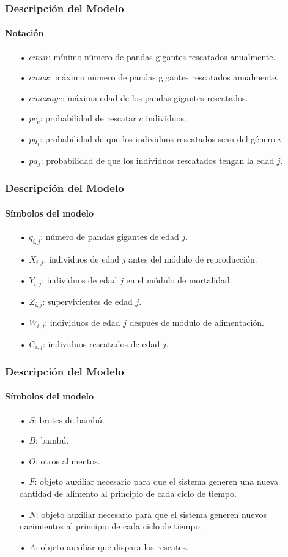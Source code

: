 \documentclass[10pt,a4paper]{beamer}
\theoremstyle{definition}
\theoremstyle{remark}
\begin{document}
\begin{frame}
\frametitle{Descripción del Modelo}
\framesubtitle{Notación}
\begin{small}
\begin{itemize}
\item[•] $cmin$: mínimo número de pandas gigantes rescatados anualmente.
\item[•] $cmax$: máximo número de pandas gigantes rescatados anualmente.
\item[•] $cmaxage$: máxima edad de los pandas gigantes rescatados.
\item[•] $pc_{c}$: probabilidad de rescatar $c$ individuos.
\item[•] $pg_{i}$: probabilidad de que los individuos rescatados sean del género $i$.
\item[•] $pa_{j}$: probabilidad de que los individuos rescatados tengan la edad $j$.
\end{itemize}
\end{small}
\end{frame}



\begin{frame}
\frametitle{Descripción del Modelo}
\framesubtitle{Símbolos del modelo}
\begin{small}
\begin{itemize}
\item[•] $q_{i,j}$: número de pandas gigantes de edad $j$.
\item[•] $X_{i,j}$: individuos de edad $j$ antes del módulo de reproducción.
\item[•] $Y_{i,j}$: individuos de edad $j$ en el módulo de mortalidad.
\item[•] $Z_{i,j}$: supervivientes de edad $j$.
\item[•] $W_{i,j}$: individuos de edad $j$ después de módulo de alimentación.
\item[•] $C_{i,j}$: individuos rescatados de edad $j$.
\end{itemize}
\end{small}
\end{frame}

\begin{frame}
\frametitle{Descripción del Modelo}
\framesubtitle{Símbolos del modelo}
\begin{small}
\begin{itemize}
\item[•] $S$: brotes de bambú.
\item[•] $B$: bambú.
\item[•] $O$: otros alimentos.
\item[•] $F$: objeto auxiliar necesario para que el sistema generen una nueva cantidad de alimento al principio de cada ciclo de tiempo.
\item[•] $N$: objeto auxiliar necesario para que el sistema generen nuevos nacimientos al principio de cada ciclo de tiempo.
\item[•] $A$: objeto auxiliar que dispara los rescates.
\end{itemize}
\end{small}
\end{frame}
\end{document}
